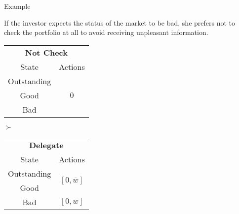 \documentclass[usenames,dvipsnames,aspectratio=169,11pt, envcountsect]{beamer}
\begin{document}
\begin{frame}[noframenumbering]{Example}

	If the investor expects the status of the market to be bad, she prefers not to check the portfolio at all to avoid receiving unpleasant information.

	\vfill

	\begin{table}[H]
		\centering
		\begin{minipage}{0.29\textwidth}
			\centering
			\begin{tabular}{c | c}
				\multicolumn{2}{c}{\textbf{Not Check}}  \\
				State       & Actions                   \\
				\hline
				Outstanding & \multirow{3}{*}{ \( 0 \)} \\
				Good        &                           \\
				Bad         &                           \\
			\end{tabular}
			\vspace{0.5cm} %
		\end{minipage}\hspace{0.3cm} %
		\( \succ \) %
		\begin{minipage}{0.29\textwidth}
			\centering
			\begin{tabular}{c | c}
				\multicolumn{2}{c}{\textbf{Delegate}}                                                                          \\
				State                             & Actions                                                                    \\
				\hline
				{\color{bleudefrance}Outstanding} & \multirow{2}{*}{{\color{bleudefrance}\( \left[0, \overline{w} \right] \)}} \\
				{\color{bleudefrance}Good}        &                                                                            \\
				Bad                               & \( \left[0, w \right]\)                                                    \\
			\end{tabular}
			\vspace{0.5cm} %
		\end{minipage}\hspace{0.3cm} %

\end{table}
\end{frame}
\end{document}
